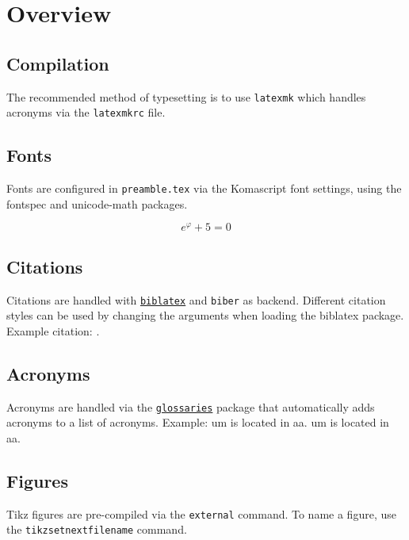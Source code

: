 
\chapter{Overview}

\section{Compilation}

The recommended method of typesetting is to use \texttt{latexmk} which handles acronyms via the \texttt{latexmkrc} file.

\section{Fonts}

Fonts are configured in \texttt{preamble.tex} via the Komascript font settings, using the fontspec and unicode-math packages.

\begin{equation}
	e^\varphi + 5 = 0
\end{equation}

\section{Citations}

Citations are handled with \href{https://www.ctan.org/pkg/biblatex}{\texttt{biblatex}} and \texttt{biber} as backend. Different citation styles can be used by changing the arguments when loading the biblatex package. Example citation: \cite{Shannon:1949ti}.

\section{Acronyms}

Acronyms are handled via the \href{https://www.ctan.org/pkg/glossaries}{\texttt{glossaries}} package that automatically adds acronyms to a list of acronyms. Example: \gls{um} is located in \gls{aa}. \gls{um} is located in \gls{aa}. 

\section{Figures}

Tikz figures are pre-compiled via the \texttt{external} command. To name a figure, use the \texttt{tikzsetnextfilename} command.

